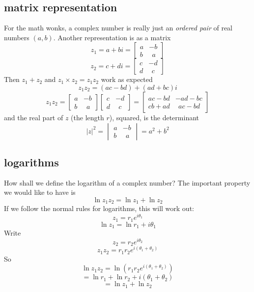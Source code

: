 \documentclass[11pt, oneside]{article}   	%
\begin{document}
\subsection*{matrix representation}
For the math wonks, a complex number is really just an \emph{ordered pair} of real numbers $(a,b)$.  Another representation is as a matrix
\[
z_1 = a + bi = 
\begin{bmatrix}
a & -b \\
b & \ \ a
\end{bmatrix}
\]
\[
z_2 = c + di = 
\begin{bmatrix}
c & -d \\
d & \ \ c
\end{bmatrix}
\]
Then $z_1 + z_2$ and $z_1 \times z_2 = z_1z_2$ work as expected
\[ z_1 z_2 = (ac - bd) + (ad + bc) i \]
\[ 
z_1 z_2 =
\begin{bmatrix}
a & -b \\
b & \ \ a
\end{bmatrix} 
\begin{bmatrix}
c & -d \\
d & \ \ c
\end{bmatrix}
= 
\begin{bmatrix}
ac - bd & -ad - bc \\
cb + ad & \ \ ac - bd
\end{bmatrix} 
\]
and the real part of $z$ (the length $r$), squared, is the determinant 
\[ |z|^2 =
\begin{vmatrix}
a & -b \\
b & \ \ a
\end{vmatrix}
= a^2 + b^2
\]
\subsection*{logarithms}
How shall we define the logarithm of a complex number?  The important property we would like to have is
\[ \ln z_1 z_2 = \ln z_1 + \ln z_2 \]
If we follow the normal rules for logarithms, this will work out:
\[ z_1 = r_1 e^{i \theta_1} \]
\[ \ln z_1 = \ln r_1 + i \theta_1 \]
Write
\[ z_2 = r_2 e^{i \theta_2} \]
\[ z_1 z_2 = r_1 r_2 e^{i (\theta_1 + \theta_2)} \]
So
\[ \ln z_1 z_2 = \ln (r_1 r_2 e^{i (\theta_1 + \theta_2)}) \]
\[ = \ln r_1 + \ln r_2 + i (\theta_1 + \theta_2) \]
\[ = \ln z_1 + \ln z_2 \]
\end{document}
